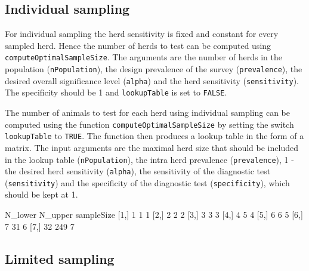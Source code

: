 \documentclass[nojss]{jss}
\begin{document}
\subsection{Individual sampling} \label{subsec:ind-sampling-noclass}

For individual sampling the herd sensitivity is fixed and constant for every sampled herd. Hence the number of herds to test can be computed using \texttt{computeOptimalSampleSize}. The arguments are the number of herds in the population (\texttt{nPopulation}), the design prevalence of the survey (\texttt{prevalence}), the desired overall significance level (\texttt{alpha}) and the herd sensitivity (\texttt{sensitivity}). The specificity should be 1 and \texttt{lookupTable} is set to \texttt{FALSE}.

The number of animals to test for each herd using individual sampling can be computed using the function \texttt{computeOptimalSampleSize} by setting the switch \texttt{lookupTable} to \texttt{TRUE}. The function then produces a lookup table in the form of a matrix. The input arguments are the maximal herd size that should be included in the  lookup table (\texttt{nPopulation}), the intra herd prevalence (\texttt{prevalence}), 1 - the desired herd sensitivity (\texttt{alpha}), the sensitivity of the diagnostic test (\texttt{sensitivity}) and the specificity of the diagnostic test (\texttt{specificity}), which should be kept at 1.

\begin{Schunk}
\begin{Soutput}
     N_lower N_upper sampleSize
[1,]       1       1          1
[2,]       2       2          2
[3,]       3       3          3
[4,]       4       5          4
[5,]       6       6          5
[6,]       7      31          6
[7,]      32     249          7
\end{Soutput}
\end{Schunk}



\subsection{Limited sampling} \label{subsec:ltd-sampling-noclass}
\end{document}
